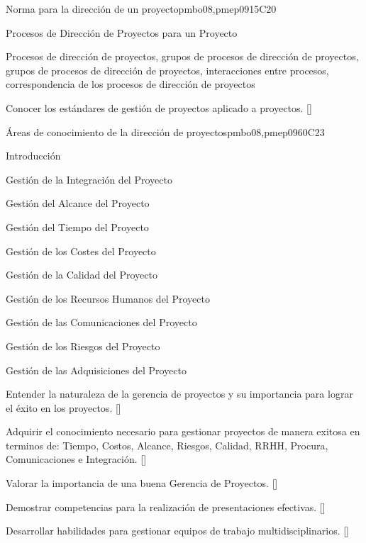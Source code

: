 \begin{syllabus}
\begin{unit}{Norma para la dirección de un proyecto}{}{pmbo08,pmep09}{15}{C20}
\begin{topics}
      \item Procesos de Dirección de Proyectos para un Proyecto
       \item Procesos de dirección de proyectos, grupos de procesos de dirección de proyectos, grupos de procesos de dirección de proyectos, interacciones entre procesos, correspondencia de los procesos de dirección de proyectos
   \end{topics}

   \begin{learningoutcomes}
      \item Conocer los estándares de gestión de proyectos aplicado a proyectos. [\Usage]
   \end{learningoutcomes}
\end{unit}

\begin{unit}{Áreas de conocimiento de la dirección de proyectos}{}{pmbo08,pmep09}{60}{C23}
\begin{topics}
      \item Introducción
      \item Gestión de la Integración del Proyecto
      \item Gestión del Alcance del Proyecto
      \item Gestión del Tiempo del Proyecto
      \item Gestión de los Costes del Proyecto
      \item Gestión de la Calidad del Proyecto
      \item Gestión de los Recursos Humanos del Proyecto
      \item Gestión de las Comunicaciones del Proyecto
      \item Gestión de los Riesgos del Proyecto
      \item Gestión de las Adquisiciones del Proyecto
   \end{topics}

   \begin{learningoutcomes}
      \item Entender la naturaleza de la gerencia de proyectos y su importancia para lograr el éxito en los proyectos. [\Assessment]
      \item Adquirir el conocimiento necesario para gestionar proyectos de manera exitosa en terminos de: Tiempo, Costos, Alcance, Riesgos, Calidad, RRHH, Procura, Comunicaciones e Integración. [\Usage]
       \item Valorar la importancia de una buena Gerencia de Proyectos. [\Assessment]
      \item Demostrar competencias para la realización de presentaciones efectivas. [\Usage]
      \item Desarrollar habilidades para gestionar equipos de trabajo multidisciplinarios. [\Usage]
   \end{learningoutcomes}
\end{unit}





\end{syllabus}
